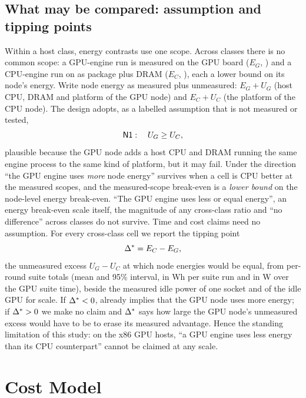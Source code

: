 \documentclass[sigconf]{acmart}
\begin{document}
\subsection{What may be compared: assumption \NOne{} and tipping points}
\label{sec:n1}
Within a host class, energy contrasts use one scope. Across classes there is no common scope: a
GPU-engine run is measured on the GPU board ($E_G$, ) and a CPU-engine run on
\CG{} as package plus DRAM ($E_C$, ), each a lower bound on its node's energy.
Write node energy as measured plus unmeasured: $E_G + U_G$ (host CPU, DRAM and platform of the
GPU node) and $E_C + U_C$ (the platform of the CPU node). The design adopts, as a labelled
assumption that is not measured or tested,
\begin{equation}
\textsf{N1}:\quad U_G \ge U_C,
\end{equation}
plausible because the GPU node adds a host CPU and DRAM running the same engine process to the
same kind of platform, but it may fail. Under \NOne{} the direction ``the GPU engine uses
\emph{more} node energy'' survives when a cell is CPU better at the measured scopes, and the
measured-scope break-even is a \emph{lower bound} on the node-level energy break-even. ``The GPU
engine uses less or equal energy'', an energy break-even scale itself, the magnitude of any
cross-class ratio and ``no difference'' across classes do not survive. Time and cost claims need
no assumption. For every cross-class cell we report the tipping point
\begin{equation}
\Delta^{*} = E_C - E_G,
\end{equation}
the unmeasured excess $U_G - U_C$ at which node energies would be equal, from per-round suite
totals (mean and 95\% interval, in Wh per suite run and in W over the GPU suite time), beside
the measured idle power of one \CG{} socket and of the idle GPU for scale. If $\Delta^{*} < 0$, \NOne{}
already implies that the GPU node uses more energy; if $\Delta^{*} > 0$ we make no claim and $\Delta^{*}$
says how large the GPU node's unmeasured excess would have to be to erase its measured
advantage. Hence the standing limitation of this study: on the x86 GPU hosts, ``a GPU engine
uses less energy than its CPU counterpart'' cannot be claimed at any scale.

\section{Cost Model}
\label{sec:cost}
\end{document}

